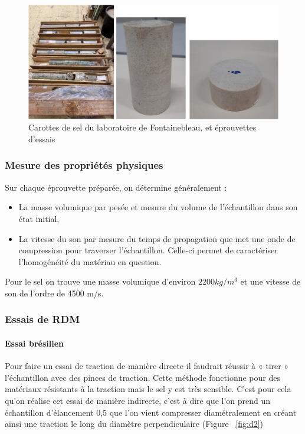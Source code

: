 \documentclass[11pt,french,a4paper]{article}
\begin{document}
\begin{figure}[h]
\centering
\includegraphics[width=.8\linewidth]{image/annexe/annexe_D/D1.png}
\caption{Carottes de sel du laboratoire de Fontainebleau, et éprouvettes d’essais}
\label{fig:d1}
\end{figure}

\FloatBarrier

\subsubsection*{Mesure des propriétés physiques }
Sur chaque éprouvette préparée, on détermine généralement : 
\begin{itemize}
\item La masse volumique par pesée et mesure du volume de l’échantillon dans son état initial,
\item La vitesse du son par mesure du temps de propagation que met une onde de compression pour traverser l'échantillon. Celle-ci permet de caractériser l’homogénéité du matériau en question. 
\end{itemize}
 
Pour le sel on trouve une masse volumique d’environ $2200 kg/m^3$ et une vitesse de son de l'ordre de 4500 m/s. 

\subsubsection*{Essais de RDM }

\paragraph{Essai brésilien }

Pour faire un essai de traction de manière directe il faudrait réussir à « tirer » l’échantillon avec des pinces de traction. Cette méthode fonctionne pour des matériaux résistants à la traction mais le sel y est très sensible. C’est pour cela qu’on réalise cet essai de manière indirecte, c’est à dire que l’on prend un échantillon d’élancement 0,5 que l’on vient compresser diamétralement en créant ainsi une traction le long du diamètre perpendiculaire (Figure ~\ref{fig:d2})
\end{document}
